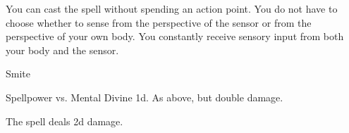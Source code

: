 You can cast the spell without spending an action point.
You do not have to choose whether to sense from the perspective of the sensor or from the perspective of your own body.
You constantly receive sensory input from both your body and the sensor.
\begin{spellsection}{Smite}
\begin{spellheader}
\end{spellheader}
\begin{spellcontent}
\begin{spelltargetinginfo}
\end{spelltargetinginfo}
\begin{spelleffects}
\begin{spellattack}{Spellpower vs. Mental}
\spellsuccess Divine  \plus1d.
\spellcritical As above, but double damage.
\end{spellattack}
\end{spelleffects}
\end{spellcontent}
\begin{spellfooter}
\end{spellfooter}
\begin{spellsubcontent}
\begin{spellcantrip}
The spell deals \minus2d damage.
\end{spellcantrip}
\end{spellsubcontent}
\end{spellsection}

